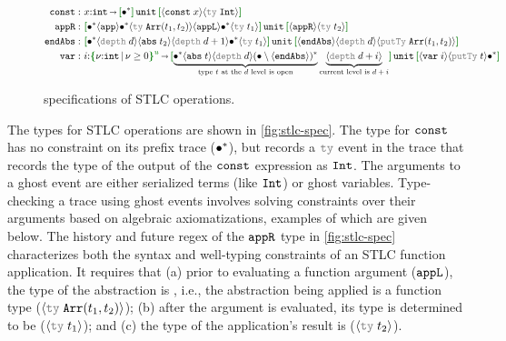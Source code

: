 \begin{figure}[t!]
  {\footnotesize
    \begin{align*}
      \eff{const} :~ &  x{:}\Int\sarr \uhat{\allA}{\Unit}{\msgA{const}{x}\msgAGray{ty}{\CInt}} \\
      \eff{appR} :~ & \uhat{\allA\msgC{app}\allA  \msgAGray{ty}{\Code{Arr}(t_1, t_2)}  \msgC{appL}  \allA  \msgAGray{ty}{t_1}  }{\Unit}{\msgC{appR}  \msgAGray{ty}{t_2}} \\
      \eff{endAbs} :~ & \uhat{\allA\msgAGray{depth}{d}\msgA{abs}{t_2}\msgAGray{depth}{d+1}\allA  \msgAGray{ty}{t_1}}{\Unit}{ \msgC{endAbs}\msgAGray{depth}{d}
        \msgAGray{putTy}{\Code{Arr}(t_1,t_2)}} \\
      \eff{var} :~ &  i{:}\urt{\Int}{\vnu \geq 0} \sarr \uhat{\underbrace{\allA\msgA{abs}{t}\msgAGray{depth}{d}(\anyA\setminus\msgC{endAbs})^*}_\text{type $t$ at the $d$ level is open}\underbrace{\msgAGray{depth}{d + i}}_\text{current level is $d + i$} }{\Unit}{\msgA{var}{i}\msgAGray{putTy}{t}  \allA}
    \end{align*}
  }
  \caption{\tyName{} specifications of STLC operations. } %
  \label{fig:stlc-spec}
\end{figure}

The types for STLC operations are shown in \autoref{fig:stlc-spec}. The type for $\boldsymbol{{\tt const}}$ has no constraint on its prefix trace
(${\bullet^*}$), but records a $\textcolor{gray}{\eff{ty}}$ event in
the trace that records the type of the output of the $\boldsymbol{{\tt const}}$
expression as ${\tt Int}$. The arguments to a ghost event are either
serialized terms (like ${\tt Int}$) or ghost variables.
Type-checking a trace using ghost events involves solving constraints
over their arguments based on algebraic axiomatizations, examples of
which are given below. The history and future regex of the $\boldsymbol{{\tt appR}}$ type in
\autoref{fig:stlc-spec} characterizes both the syntax and well-typing
constraints of an STLC function application. It requires that (a)
prior to evaluating a function argument ($\boldsymbol{{\tt appL}}$), the type of
the abstraction is , i.e., the abstraction
being applied is a function type ($\msgAGray{ty}{\Code{Arr}(t_1,t_2)}$); (b) after the argument is evaluated, its type is
  determined to be  ($\msgAGray{ty}{t_1}$); and (c)
  the type of the application's result is 
  ($\msgAGray{ty}{t_2}$).

